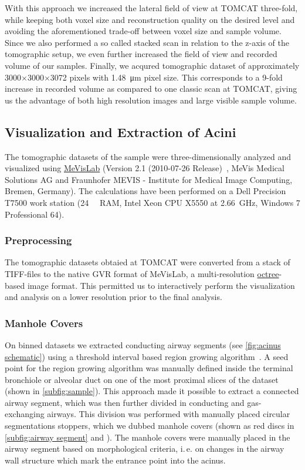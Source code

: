 \documentclass[%
	draft=false,
	paper=a4,%
	twoside=true,%
	draft=false,%
	abstract=false]{scrartcl}
\newcommand{\ie}{i.\,e.\xspace}
\begin{document}
With this approach we increased the lateral field of view at TOMCAT three-fold, while keeping both voxel size and reconstruction quality on the desired level and avoiding the aforementioned trade-off between voxel size and sample volume. Since we also performed a so called stacked scan in relation to the z-axis of the tomographic setup, we even further increased the field of view and recorded volume of our samples. Finally, we acqured tomographic dataset of approximately 3000\(\times\)3000\(\times\)3072 pixels  with \SI{1.48}{\micro\meter} pixel size. This corresponds to a 9-fold increase in recorded volume as compared to one classic scan at TOMCAT, giving us the advantage of both high resolution images and large visible sample volume.

\subsection{Visualization and Extraction of Acini}
The tomographic datasets of the sample were three-dimensionally analyzed and visualized using \href{http://mevislab.de}{MeVisLab} (Version 2.1 (2010-07-26 Release)~\cite{Bitter2007}, MeVis Medical Solutions AG and Fraunhofer MEVIS - Institute for Medical Image Computing, Bremen, Germany). The calculations have been performed on a Dell Precision T7500 work station (\SI{24}{\giga\byte} RAM, Intel Xeon CPU X5550 at \SI{2.66}{\giga\hertz}, Windows 7 Professional \SI{64}{\bit}).

\subsubsection{Preprocessing}
The tomographic datasets obtaied at TOMCAT were converted from a stack of TIFF-files to the native GVR format of MeVisLab, a multi-resolution \href{https://secure.wikimedia.org/wikipedia/en/w/index.php?title=Octree&oldid=409131920}{octree}-based image format. This permitted us to interactively perform the visualization and analysis on a lower resolution prior to the final analysis.

\subsubsection{Manhole Covers}\label{sec:manhole covers}
On binned datasets we extracted conducting airway segments (see \autoref{fig:acinus schematic}) using a threshold interval based region growing algorithm~\cite{Zucker1976}. A seed point for the region growing algorithm was manually defined inside the terminal bronchiole or alveolar duct on one of the most proximal slices of the dataset (shown in \autoref{subfig:sample}). This approach made it possible to extract a connected airway segment, which was then further divided in conducting and gas-exchanging airways. This division was performed with manually placed circular segmentations stoppers, which we dubbed manhole covers (shown as red discs in \autoref{subfig:airway segment} and ). The manhole covers were manually placed in the airway segment based on morphological criteria, \ie on changes in the airway wall structure which mark the entrance point into the acinus.
\end{document}
